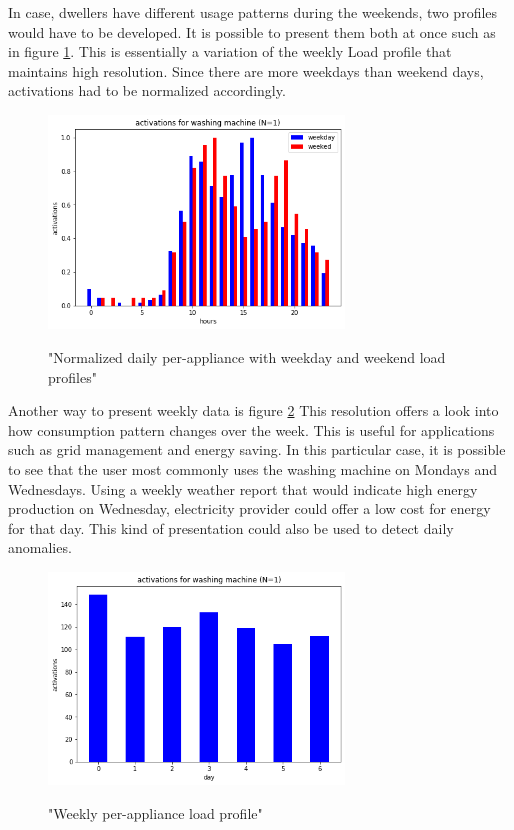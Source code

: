 In case, dwellers have different usage patterns during the weekends, two profiles would have to be developed.
It is possible to present them both at once such as in figure \ref{fig:WM_ww_daily}. 
This is essentially a variation of the weekly Load profile that maintains high resolution.
Since there are more weekdays than weekend days, activations had to be normalized accordingly.
\begin{figure}[H]
	\centering
	\caption{"Normalized daily per-appliance with weekday and weekend load profiles"}
	\includegraphics[width=0.7\textwidth]{../Figures/LPS/WM_ww_daily.png}
	\label{fig:WM_ww_daily}
\end{figure}

Another way to present weekly data is figure \ref{fig:WM_weekly}
This resolution offers a look into how consumption pattern changes over
the week. This is useful for applications such as grid management and energy saving.
In this particular case, it is possible to see that the user most commonly uses the washing machine on Mondays and Wednesdays.
Using a weekly weather report that would indicate high energy production on Wednesday, electricity provider could offer a low cost for energy for that day. 
This kind of presentation could also be used to detect daily anomalies.

\begin{figure}[H]
	\centering
	\caption{"Weekly per-appliance load profile"}
	\includegraphics[width=0.7\textwidth]{../Figures/LPS/WM_weekly.png}
	\label{fig:WM_weekly}
\end{figure}

